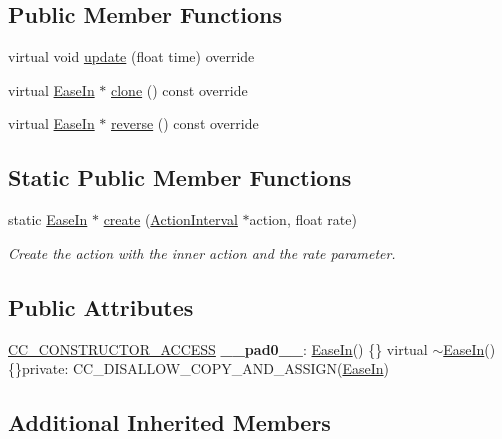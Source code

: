 \subsection*{Public Member Functions}
\begin{DoxyCompactItemize}
\item 
virtual void \hyperlink{classEaseIn_a9a03c0c893472d723d2d905e5fd39856}{update} (float time) override
\item 
virtual \hyperlink{classEaseIn}{Ease\+In} $\ast$ \hyperlink{classEaseIn_ac2db345fad4b62fa8485e6d40121a83c}{clone} () const override
\item 
virtual \hyperlink{classEaseIn}{Ease\+In} $\ast$ \hyperlink{classEaseIn_adc23609d0a863b45012b4b6361178728}{reverse} () const override
\end{DoxyCompactItemize}
\subsection*{Static Public Member Functions}
\begin{DoxyCompactItemize}
\item 
static \hyperlink{classEaseIn}{Ease\+In} $\ast$ \hyperlink{classEaseIn_a242a4605c0fcbcd78ba7a2f5e9962116}{create} (\hyperlink{classActionInterval}{Action\+Interval} $\ast$action, float rate)
\begin{DoxyCompactList}\small\item\em Create the action with the inner action and the rate parameter. \end{DoxyCompactList}\end{DoxyCompactItemize}
\subsection*{Public Attributes}
\begin{DoxyCompactItemize}
\item 
\mbox{\label{classEaseIn_a54d2c1aa88ff6d1a9dcccc839858c87d}} 
\hyperlink{_2cocos2d_2cocos_2base_2ccConfig_8h_a25ef1314f97c35a2ed3d029b0ead6da0}{C\+C\+\_\+\+C\+O\+N\+S\+T\+R\+U\+C\+T\+O\+R\+\_\+\+A\+C\+C\+E\+SS} {\bfseries \+\_\+\+\_\+pad0\+\_\+\+\_\+}\+: \hyperlink{classEaseIn}{Ease\+In}() \{\} virtual $\sim$\hyperlink{classEaseIn}{Ease\+In}() \{\}private\+: C\+C\+\_\+\+D\+I\+S\+A\+L\+L\+O\+W\+\_\+\+C\+O\+P\+Y\+\_\+\+A\+N\+D\+\_\+\+A\+S\+S\+I\+GN(\hyperlink{classEaseIn}{Ease\+In})
\end{DoxyCompactItemize}
\subsection*{Additional Inherited Members}


